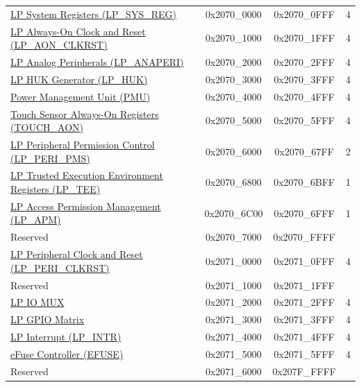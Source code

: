 \begin{ThreePartTable}
\begin{longtable}[c]{ |p{7cm}|c|c|r| }
        \rowcolor{lightgray}\multicolumn{4}{|l|}{\textbf{LP Peripherals}}\\\hline
    \hyperref[mod:sysreg]{LP System Registers (LP\_SYS\_REG)} & 0x2070\_0000 & 0x2070\_0FFF &   4\\\hline
    \hyperref[mod:resclk]{LP Always-On Clock and Reset (LP\_AON\_CLKRST)} & 0x2070\_1000 & 0x2070\_1FFF &   4\\\hline
    \hyperref[mod:lowpowm]{LP Analog Peripherals (LP\_ANAPERI)} & 0x2070\_2000 & 0x2070\_2FFF &   4\\\hline
    \hyperref[mod:keymng]{LP HUK Generator (LP\_HUK)} & 0x2070\_3000 & 0x2070\_3FFF &   4\\\hline
    \hyperref[mod:lowpowm]{Power Management Unit (PMU)} & 0x2070\_4000 & 0x2070\_4FFF &   4\\\hline
    \hyperref[mod:tchsen]{Touch Sensor Always-On Registers (TOUCH\_AON)} & 0x2070\_5000 & 0x2070\_5FFF &   4\\\hline
    \hyperref[mod:permctrl]{LP Peripheral Permission Control (LP\_PERI\_PMS)} & 0x2070\_6000 & 0x2070\_67FF &   2\\\hline
    \hyperref[mod:permctrl]{LP Trusted Execution Environment Registers (LP\_TEE)} & 0x2070\_6800 & 0x2070\_6BFF &   1\\\hline
    \hyperref[mod:permctrl]{LP Access Permission Management (LP\_APM)} & 0x2070\_6C00 & 0x2070\_6FFF &   1\\\hline
        \rowcolor{gray!25}  Reserved        & 0x2070\_7000 & 0x2070\_FFFF &    \\\hline
    \hyperref[mod:resclk]{LP Peripheral Clock and Reset (LP\_PERI\_CLKRST)} & 0x2071\_0000 & 0x2071\_0FFF &   4\\\hline
        \rowcolor{gray!25}  Reserved        & 0x2071\_1000 & 0x2071\_1FFF &    \\\hline
    \hyperref[mod:iomuxgpio]{LP IO MUX} & 0x2071\_2000 & 0x2071\_2FFF &   4\\\hline
    \hyperref[mod:iomuxgpio]{LP GPIO Matrix} & 0x2071\_3000 & 0x2071\_3FFF &   4\\\hline
    \hyperref[mod:ulp]{LP Interrupt (LP\_INTR)} & 0x2071\_4000 & 0x2071\_4FFF &   4\\\hline
    \hyperref[mod:efuse]{eFuse Controller (EFUSE)} & 0x2071\_5000 & 0x2071\_5FFF &   4\\\hline
        \rowcolor{gray!25}  Reserved        & 0x2071\_6000 & 0x207F\_FFFF &    \\\hline


\end{longtable}
\end{ThreePartTable}

